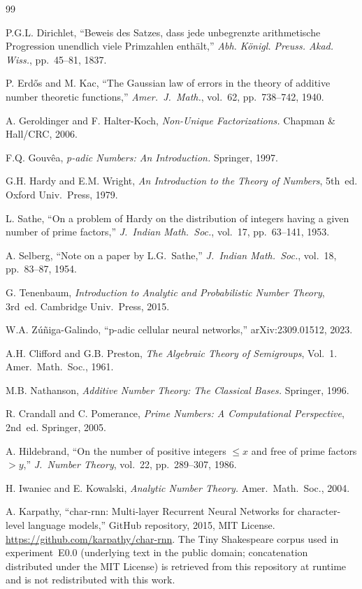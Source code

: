 \documentclass[10pt,twocolumn]{article}
\begin{document}
\begin{thebibliography}{99}

P.G.L. Dirichlet,
``Beweis des Satzes, dass jede unbegrenzte arithmetische Progression
unendlich viele Primzahlen enthält,''
\textit{Abh. Königl. Preuss. Akad. Wiss.}, pp.\ 45--81, 1837.

P. Erd\H{o}s and M. Kac,
``The Gaussian law of errors in the theory of additive number theoretic
functions,''
\textit{Amer.\ J.\ Math.}, vol.\ 62, pp.\ 738--742, 1940.

A. Geroldinger and F. Halter-Koch,
\textit{Non-Unique Factorizations.} Chapman \& Hall/CRC, 2006.

F.Q. Gouv\^{e}a,
\textit{p-adic Numbers: An Introduction.} Springer, 1997.

G.H. Hardy and E.M. Wright,
\textit{An Introduction to the Theory of Numbers}, 5th~ed.
Oxford Univ.\ Press, 1979.

L. Sathe,
``On a problem of Hardy on the distribution of integers having a given
number of prime factors,''
\textit{J.\ Indian Math.\ Soc.}, vol.\ 17, pp.\ 63--141, 1953.

A. Selberg,
``Note on a paper by L.G.\ Sathe,''
\textit{J.\ Indian Math.\ Soc.}, vol.\ 18, pp.\ 83--87, 1954.

G. Tenenbaum,
\textit{Introduction to Analytic and Probabilistic Number Theory},
3rd~ed. Cambridge Univ.\ Press, 2015.

W.A. Z\'{u}\~{n}iga-Galindo,
``p-adic cellular neural networks,''
arXiv:2309.01512, 2023.

A.H. Clifford and G.B. Preston,
\textit{The Algebraic Theory of Semigroups}, Vol.~1.
Amer.\ Math.\ Soc., 1961.

M.B. Nathanson,
\textit{Additive Number Theory: The Classical Bases.}
Springer, 1996.

R. Crandall and C. Pomerance,
\textit{Prime Numbers: A Computational Perspective}, 2nd~ed.
Springer, 2005.

A. Hildebrand,
``On the number of positive integers $\leq x$ and free of prime
factors $> y$,''
\textit{J.\ Number Theory}, vol.\ 22, pp.\ 289--307, 1986.

H. Iwaniec and E. Kowalski,
\textit{Analytic Number Theory.}
Amer.\ Math.\ Soc., 2004.

A. Karpathy,
``char-rnn: Multi-layer Recurrent Neural Networks for character-level
language models,'' GitHub repository, 2015, MIT License.
\url{https://github.com/karpathy/char-rnn}.
The Tiny Shakespeare corpus used in experiment~E0.0 (underlying text in
the public domain; concatenation distributed under the MIT License) is
retrieved from this repository at runtime and is not redistributed with
this work.

\end{thebibliography}
\end{document}
